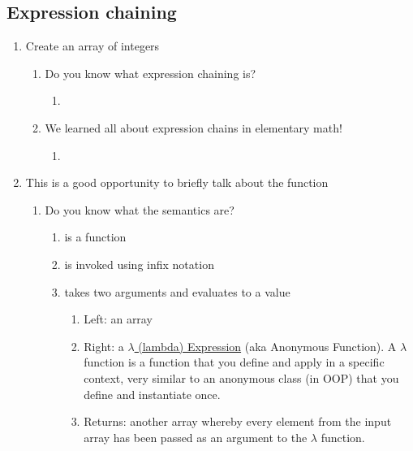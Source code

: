 \subsection{Expression chaining}
\begin{enumerate}[resume*]
\item Create an array of integers
  \begin{enumerate}
  \item Do you know what expression chaining is?
    \begin{enumerate}
    \item {}
    \end{enumerate}
  \item We learned all about expression chains in elementary math!
    \begin{enumerate}
    \item {}
    \end{enumerate}
  \end{enumerate}
\item This is a good opportunity to briefly talk about the  function
  \begin{enumerate}
  \item Do you know what the  semantics are?
    \begin{enumerate}
    \item {} is a function
    \item {} is invoked using infix notation
    \item {} takes two arguments and evaluates to a value
      \begin{enumerate}
      \item Left: an array
      \item Right: a \href{https://en.wikipedia.org/wiki/Lambda\_calculus}{$\lambda$ (lambda) Expression} (aka Anonymous Function). A $\lambda$ function is a function that you define and apply in a specific context, very similar to an anonymous class (in OOP) that you define and instantiate once.
      \item Returns: another array whereby every element from the input array has been passed as an argument to the $\lambda$ function.
      \end{enumerate}
    \end{enumerate}
  \end{enumerate}
\end{enumerate}

